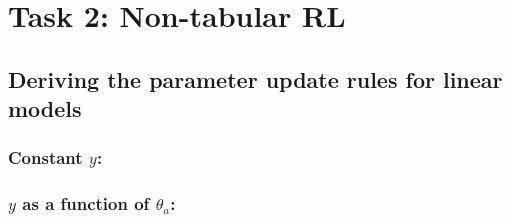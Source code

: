 \section{Task 2: Non-tabular RL}
\subsection{Deriving the parameter update rules for linear models}


\subsubsection{Constant $y$:}


\subsubsection{$y$ as a function of $\theta_a$:}

